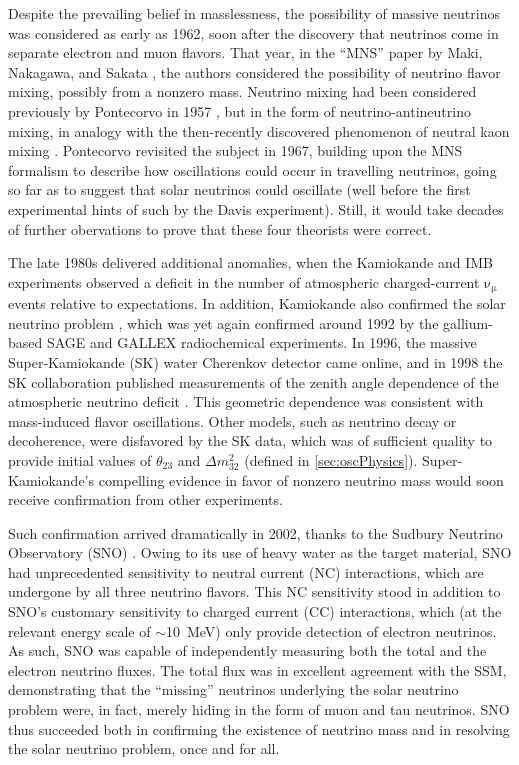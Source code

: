 \documentclass[../thesis.tex]{subfiles}
\begin{document}
Despite the prevailing belief in masslessness, the possibility of massive neutrinos was considered as early as 1962, soon after the discovery that neutrinos come in separate electron and muon flavors. That year, in the ``MNS'' paper by Maki, Nakagawa, and Sakata \cite{10.1143/PTP.28.870}, the authors considered the possibility of neutrino flavor mixing, possibly from a nonzero mass. Neutrino mixing had been considered previously by Pontecorvo in 1957 \cite{Pontecorvo:1957cp}, but in the form of neutrino-antineutrino mixing, in analogy with the then-recently discovered phenomenon of neutral kaon mixing \cite{PhysRev.105.1925.2}. Pontecorvo revisited the subject in 1967, building upon the MNS formalism to describe how oscillations could occur in travelling neutrinos, going so far as to suggest that solar neutrinos could oscillate (well before the first experimental hints of such by the Davis experiment). Still, it would take decades of further obervations to prove that these four theorists were correct.

The late 1980s delivered additional anomalies, when the Kamiokande \cite{HIRATA1988416} and IMB \cite{PhysRevLett.66.2561} experiments observed a deficit in the number of atmospheric charged-current \(\mathrm{\nu_\mu}\) events relative to expectations. In addition, Kamiokande also confirmed the solar neutrino problem \cite{SUZUKI199554}, which was yet again confirmed around 1992 by the gallium-based SAGE \cite{GAVRIN200136} and GALLEX \cite{VIGNAUD199820} radiochemical experiments. In 1996, the massive Super-Kamiokande (SK) water Cherenkov detector came online, and in 1998 the SK collaboration published measurements of the zenith angle dependence of the atmospheric neutrino deficit \cite{PhysRevLett.81.1562}. This geometric dependence was consistent with mass-induced flavor oscillations. Other models, such as neutrino decay or decoherence, were disfavored by the SK data, which was of sufficient quality to provide initial values of \(\theta_{23}\) and \(\Delta m^2_{32}\) (defined in \autoref{sec:oscPhysics}). Super-Kamiokande's compelling evidence in favor of nonzero neutrino mass would soon receive confirmation from other experiments.

Such confirmation arrived dramatically in 2002, thanks to the Sudbury Neutrino Observatory (SNO) \cite{PhysRevLett.89.011301}. Owing to its use of heavy water as the target material, SNO had unprecedented sensitivity to neutral current (NC) interactions, which are undergone by all three neutrino flavors. This NC sensitivity stood in addition to SNO's customary sensitivity to charged current (CC) interactions, which (at the relevant energy scale of $\sim$10~MeV) only provide detection of electron neutrinos. As such, SNO was capable of independently measuring both the total and the electron neutrino fluxes. The total flux was in excellent agreement with the SSM, demonstrating that the ``missing'' neutrinos underlying the solar neutrino problem were, in fact, merely hiding in the form of muon and tau neutrinos. SNO thus succeeded both in confirming the existence of neutrino mass and in resolving the solar neutrino problem, once and for all.
\end{document}
